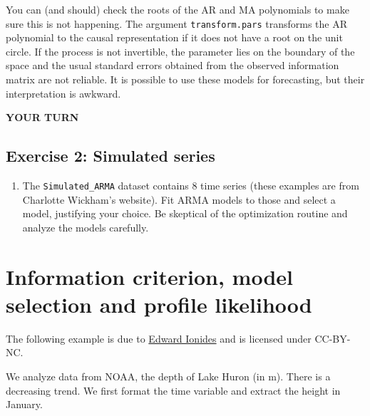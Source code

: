 \documentclass[]{book}
\newenvironment{Shaded}{\begin{snugshade}}{\end{snugshade}}
\newcommand{\KeywordTok}[1]{\textcolor[rgb]{0.13,0.29,0.53}{\textbf{#1}}}
\newcommand{\DataTypeTok}[1]{\textcolor[rgb]{0.13,0.29,0.53}{#1}}
\newcommand{\DecValTok}[1]{\textcolor[rgb]{0.00,0.00,0.81}{#1}}
\newcommand{\StringTok}[1]{\textcolor[rgb]{0.31,0.60,0.02}{#1}}
\newcommand{\CommentTok}[1]{\textcolor[rgb]{0.56,0.35,0.01}{\textit{#1}}}
\newcommand{\OtherTok}[1]{\textcolor[rgb]{0.56,0.35,0.01}{#1}}
\newcommand{\OperatorTok}[1]{\textcolor[rgb]{0.81,0.36,0.00}{\textbf{#1}}}
\newcommand{\NormalTok}[1]{#1}
\providecommand{\tightlist}{%
  \setlength{\itemsep}{0pt}\setlength{\parskip}{0pt}}
\begin{document}
You can (and should) check the roots of the AR and MA polynomials to
make sure this is not happening. The argument \texttt{transform.pars}
transforms the AR polynomial to the causal representation if it does not
have a root on the unit circle. If the process is not invertible, the
parameter lies on the boundary of the space and the usual standard
errors obtained from the observed information matrix are not reliable.
It is possible to use these models for forecasting, but their
interpretation is awkward.

\textbf{YOUR TURN}

\subsection{Exercise 2: Simulated
series}\label{exercise-2-simulated-series}

\begin{enumerate}
\def\labelenumi{\arabic{enumi}.}
\tightlist
\item
  The \texttt{Simulated\_ARMA} dataset contains 8 time series (these
  examples are from Charlotte Wickham's website). Fit ARMA models to
  those and select a model, justifying your choice. Be skeptical of the
  optimization routine and analyze the models carefully.
\end{enumerate}

\section{Information criterion, model selection and profile
likelihood}\label{information-criterion-model-selection-and-profile-likelihood}

The following example is due to
\href{http://ionides.github.io/531w16/notes05/notes5.html}{Edward
Ionides} and is licensed under CC-BY-NC.

We analyze data from NOAA, the depth of Lake Huron (in m). There is a
decreasing trend. We first format the time variable and extract the
height in January.

\begin{Shaded}
\end{Shaded}
\end{document}
